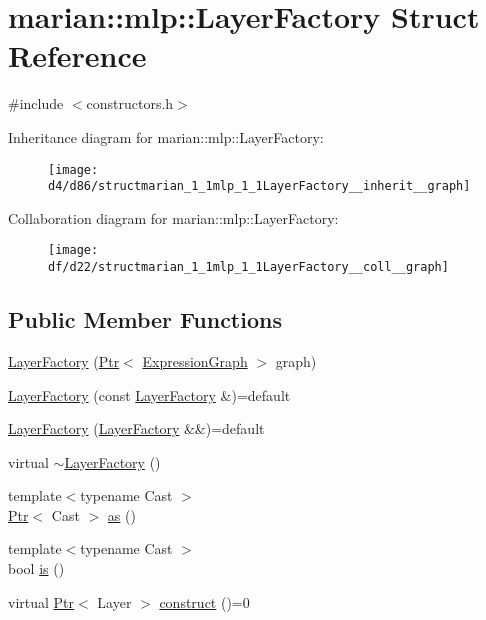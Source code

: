 \hypertarget{structmarian_1_1mlp_1_1LayerFactory}{}\section{marian\+:\+:mlp\+:\+:Layer\+Factory Struct Reference}
\label{structmarian_1_1mlp_1_1LayerFactory}


{\ttfamily \#include $<$constructors.\+h$>$}



Inheritance diagram for marian\+:\+:mlp\+:\+:Layer\+Factory\+:
\nopagebreak
\begin{figure}[H]
\begin{center}
\leavevmode
\texttt{[image: d4/d86/structmarian\_1\_1mlp\_1\_1LayerFactory\_\_inherit\_\_graph]}
\end{center}
\end{figure}


Collaboration diagram for marian\+:\+:mlp\+:\+:Layer\+Factory\+:
\nopagebreak
\begin{figure}[H]
\begin{center}
\leavevmode
\texttt{[image: df/d22/structmarian\_1\_1mlp\_1\_1LayerFactory\_\_coll\_\_graph]}
\end{center}
\end{figure}
\subsection*{Public Member Functions}
\begin{DoxyCompactItemize}
\item 
\hyperlink{structmarian_1_1mlp_1_1LayerFactory_aa191841467f48299dc2a96039972d3f8}{Layer\+Factory} (\hyperlink{namespacemarian_ad1a373be43a00ef9ce35666145137b08}{Ptr}$<$ \hyperlink{classmarian_1_1ExpressionGraph}{Expression\+Graph} $>$ graph)
\item 
\hyperlink{structmarian_1_1mlp_1_1LayerFactory_a5abd59b38025090b212d846add90dc31}{Layer\+Factory} (const \hyperlink{structmarian_1_1mlp_1_1LayerFactory}{Layer\+Factory} \&)=default
\item 
\hyperlink{structmarian_1_1mlp_1_1LayerFactory_a2759e7b5d53bcad1b2a4dc0c26145921}{Layer\+Factory} (\hyperlink{structmarian_1_1mlp_1_1LayerFactory}{Layer\+Factory} \&\&)=default
\item 
virtual \hyperlink{structmarian_1_1mlp_1_1LayerFactory_aa28e52b10ff8ccebcbca6fc7684bc536}{$\sim$\+Layer\+Factory} ()
\item 
{\footnotesize template$<$typename Cast $>$ }\\\hyperlink{namespacemarian_ad1a373be43a00ef9ce35666145137b08}{Ptr}$<$ Cast $>$ \hyperlink{structmarian_1_1mlp_1_1LayerFactory_a955c3bcab08efb7c186eaa350ca85893}{as} ()
\item 
{\footnotesize template$<$typename Cast $>$ }\\bool \hyperlink{structmarian_1_1mlp_1_1LayerFactory_ac5072d88c0406e5e4f4e769d554f07e5}{is} ()
\item 
virtual \hyperlink{namespacemarian_ad1a373be43a00ef9ce35666145137b08}{Ptr}$<$ Layer $>$ \hyperlink{structmarian_1_1mlp_1_1LayerFactory_adf4c58df3dd15cd1904cdd66bf45c7b9}{construct} ()=0
\end{DoxyCompactItemize}
